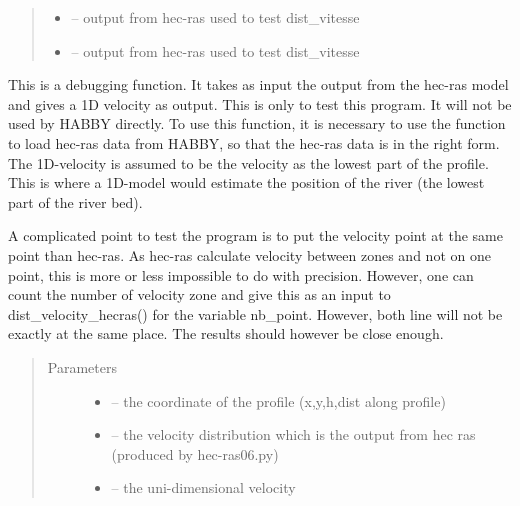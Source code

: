 \documentclass[letterpaper,10pt,english]{sphinxmanual}
\begin{document}
\begin{fulllineitems}
\begin{quote}
\begin{description}
\begin{itemize}
\item {} 
 -- output from hec-ras used to test dist\_vitesse

\item {} 
 -- output from hec-ras used to test dist\_vitesse

\end{itemize}

\end{description}\end{quote}

\end{fulllineitems}


\begin{fulllineitems}
\label{\detokenize{index:src.dist_vistess2.preparetest_velocity}}
This is a debugging function. It takes as input the output from the hec-ras model and gives a 1D velocity as
output. This is only to test this program. It will not be used by HABBY directly. To use this function, it is
necessary to use the function to load hec-ras data from HABBY, so that the hec-ras data is in the right form.
The 1D-velocity is assumed to be the velocity as the lowest part of the profile. This is where a 1D-model would
estimate the position of the river (the lowest part of the river bed).

A complicated point to test the program is to put the velocity point at the same point than hec-ras. As hec-ras
calculate velocity between zones and not on one point, this is more or less impossible to do with precision.
However, one can count the number of velocity zone and give this as an input to dist\_velocity\_hecras() for the
variable nb\_point. However, both line will not be exactly at the same place. The results should however be close
enough.
\begin{quote}\begin{description}
\item[{Parameters}] \leavevmode\begin{itemize}
\item {} 
 -- the coordinate of the profile (x,y,h,dist along profile)

\item {} 
 -- the velocity distribution which is the output from hec ras (produced by hec-ras06.py)

\item {} 
 -- the uni-dimensional velocity

\end{itemize}

\end{description}\end{quote}

\end{fulllineitems}
\end{document}
